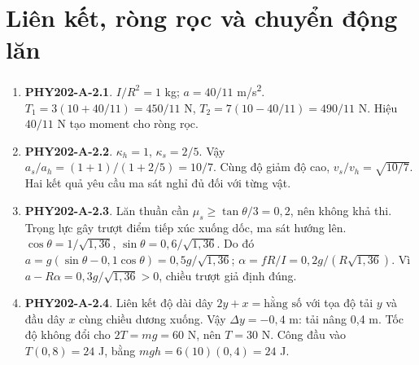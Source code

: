 \documentclass[11pt,a4paper,openany]{book}
\begin{document}
\section{Liên kết, ròng rọc và chuyển động lăn}
\begin{enumerate}
\item \textbf{PHY202-A-2.1}. $I/R^2=1$ kg; $a=40/11$ m/s\textsuperscript{2}. $T_1=3(10+40/11)=450/11$ N, $T_2=7(10-40/11)=490/11$ N. Hiệu $40/11$ N tạo moment cho ròng rọc.
\item \textbf{PHY202-A-2.2}. $\kappa_h=1$, $\kappa_s=2/5$. Vậy $a_s/a_h=(1+1)/(1+2/5)=10/7$. Cùng độ giảm độ cao, $v_s/v_h=\sqrt{10/7}$. Hai kết quả yêu cầu ma sát nghỉ đủ đối với từng vật.
\item \textbf{PHY202-A-2.3}. Lăn thuần cần $\mu_s\ge\tan\theta/3=0{,}2$, nên không khả thi. Trọng lực gây trượt điểm tiếp xúc xuống dốc, ma sát hướng lên. $\cos\theta=1/\sqrt{1{,}36}$, $\sin\theta=0{,}6/\sqrt{1{,}36}$. Do đó $a=g(\sin\theta-0{,}1\cos\theta)=0{,}5g/\sqrt{1{,}36}$; $\alpha=fR/I=0{,}2g/(R\sqrt{1{,}36})$. Vì $a-R\alpha=0{,}3g/\sqrt{1{,}36}>0$, chiều trượt giả định đúng.
\item \textbf{PHY202-A-2.4}. Liên kết độ dài dây $2y+x=\text{hằng số}$ với tọa độ tải $y$ và đầu dây $x$ cùng chiều dương xuống. Vậy $\Delta y=-0{,}4$ m: tải nâng 0,4 m. Tốc độ không đổi cho $2T=mg=60$ N, nên $T=30$ N. Công đầu vào $T(0{,}8)=24$ J, bằng $mgh=6(10)(0{,}4)=24$ J.
\end{enumerate}
\end{document}
